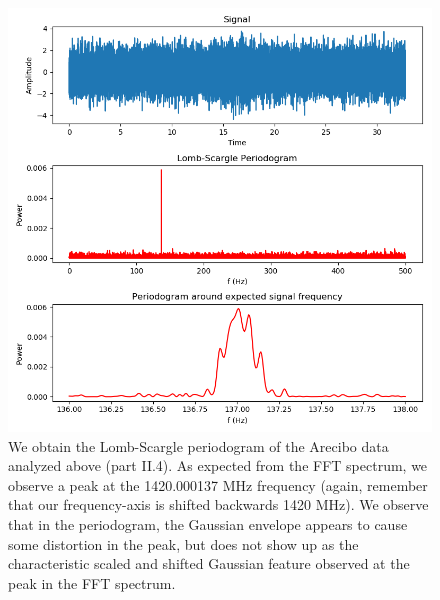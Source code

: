 \documentclass[11pt]{article}
\begin{document}
\begin{enumerate}
	\begin{figure}[htp]
	\centering
	\includegraphics[scale=0.80]{arecibo_lombscargle.png}
	\caption{We obtain the Lomb-Scargle periodogram of the Arecibo data analyzed above (part II.4). As expected from the FFT spectrum, we observe a peak at the 1420.000137 MHz frequency (again, remember that our frequency-axis is shifted backwards 1420 MHz). We observe that in the periodogram, the Gaussian envelope appears to cause some distortion in the peak, but does not show up as the characteristic scaled and shifted Gaussian feature observed at the peak in the FFT spectrum.}
	\label{ls_arecibo}
	\end{figure}
	\newpage
	

\end{enumerate}
\end{document}
